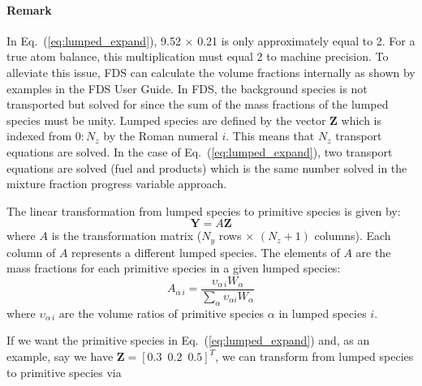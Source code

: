 \paragraph{Remark}
In Eq.~(\ref{eq:lumped_expand}), 9.52 $\times$ 0.21 is only approximately equal to 2. For a true atom balance, this multiplication must equal 2 to machine precision. To alleviate this issue, FDS can calculate the volume fractions internally as shown by examples in the FDS User Guide.
\baselineskip
In FDS, the background species is not transported but solved for since the sum of the mass fractions of the lumped species must be unity. Lumped species are defined by the vector $\textbf{Z}$ which is indexed from $0:N_{z}$ by the Roman numeral $i$. This means that $N_{z}$ transport equations are solved. In the case of Eq.~(\ref{eq:lumped_expand}), two transport equations are solved (fuel and products) which is the same number solved in the mixture fraction progress variable approach.

The linear transformation from lumped species to primitive species is given by: 
\begin{equation}\label{eq:transform}
\textbf{Y}=A\textbf{Z} 
\end{equation}
where $A$ is the transformation matrix ($N_{y}$ rows $\times$ $(N_{z}+1)$ columns).  Each column of $A$ represents a different lumped species.  The elements of $A$ are the mass fractions for each primitive species in a given lumped species:
\begin{equation}\label{eq:A_def}
A_{\alpha\,i} = \frac{\upsilon_{\alpha\,i}W_{\alpha}}{\displaystyle \sum_{\alpha}\upsilon_{\alpha i}W_{\alpha}}
\end{equation}
where $\upsilon_{\alpha\,i}$ are the volume ratios of primitive species $\alpha$ in lumped species $i$.

If we want the primitive species in Eq.~(\ref{eq:lumped_expand}) and, as an example, say we have $\mathbf{Z} = [0.3 \,\,\, 0.2 \,\,\, 0.5]^T$, we can transform from lumped species to primitive species via

